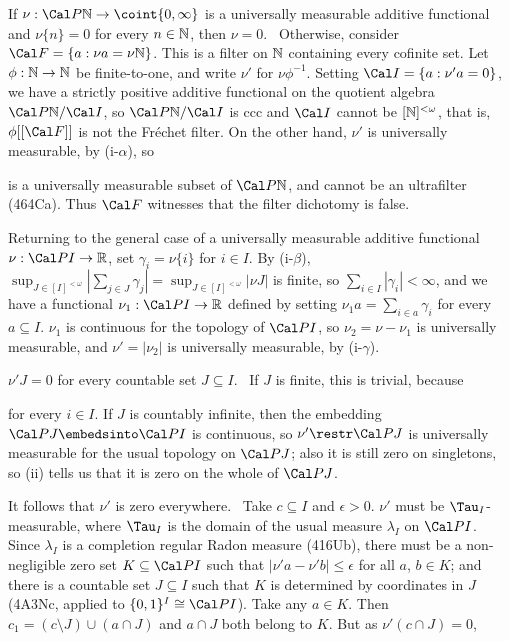 {\medskip

 If $\nu:\Cal P\Bbb N\to\coint{0,\infty}$
is a universally measurable additive functional and $\nu\{n\}=0$ for every
$n\in\Bbb N$, then $\nu=0$.   \Prf\Quer\ Otherwise, consider
$\Cal F=\{a:\nu a=\nu\Bbb N\}$.   This is a filter on $\Bbb N$
containing every cofinite set.   Let $\phi:\Bbb N\to\Bbb N$ be
finite-to-one, and write $\nu'$ for $\nu\phi^{-1}$.
Setting $\Cal I=\{a:\nu'a=0\}$, we have
a strictly positive additive functional on the quotient algebra
$\Cal P\Bbb N/\Cal I$, so $\Cal P\Bbb N/\Cal I$ is ccc and $\Cal I$ cannot
be $[\Bbb N]^{<\omega}$, that is, $\phi[[\Cal F]]$ is not
the Fr\'echet filter.   On the other hand,
$\nu'$ is universally measurable, by (i-$\alpha$), so


\noindent is a universally measurable subset of $\Cal P\Bbb N$, and
cannot be an ultrafilter (464Ca).   Thus $\Cal F$ witnesses that the filter
dichotomy is false.\ \Bang\Qed

\medskip

 Returning to the general case of a universally measurable
additive functional $\nu:\Cal PI\to\Bbb R$, set $\gamma_i=\nu\{i\}$ for
$i\in I$.   By (i-$\beta$),
$\sup_{J\in[I]^{<\omega}}|\sum_{j\in J}\gamma_j|
=\sup_{J\in[I]^{<\omega}}|\nu J|$ is finite, so
$\sum_{i\in I}|\gamma_i|<\infty$, and we have a functional
$\nu_1:\Cal PI\to\Bbb R$ defined by setting $\nu_1a=\sum_{i\in a}\gamma_i$
for every $a\subseteq I$.   $\nu_1$ is continuous for the topology of
$\Cal PI$, so $\nu_2=\nu-\nu_1$ is universally measurable, and
$\nu'=|\nu_2|$ is universally measurable, by (i-$\gamma$).

$\nu'J=0$ for every countable set $J\subseteq I$.   \Prf\ If $J$ is finite,
this is trivial, because


\noindent for every $i\in I$.   If $J$ is countably infinite, then
the embedding $\Cal PJ\embedsinto\Cal PI$ is continuous, so
$\nu'\restr\Cal PJ$ is universally measurable for the usual topology on
$\Cal PJ$;  also it is still zero on singletons, so (ii) tells us that it
is zero on the whole of $\Cal PJ$.\ \Qed

It follows that
$\nu'$ is zero everywhere.   \Prf\ Take $c\subseteq I$ and $\epsilon>0$.
$\nu'$ must be $\Tau_I$-measurable, where $\Tau_I$ is the domain of
the usual measure $\lambda_I$ on $\Cal PI$.   Since $\lambda_I$ is a
completion regular Radon measure (416Ub), there must be a non-negligible
zero set $K\subseteq\Cal PI$ such that $|\nu'a-\nu'b|\le\epsilon$ for all
$a$, $b\in K$;  and there is a countable set $J\subseteq I$ such that $K$
is determined by coordinates in $J$ (4A3Nc, applied to
$\{0,1\}^I\cong\Cal PI$).   Take any $a\in K$.   Then
$c_1=(c\setminus J)\cup(a\cap J)$ and $a\cap J$ both belong to $K$.
But as $\nu'(c\cap J)=0$,

}
